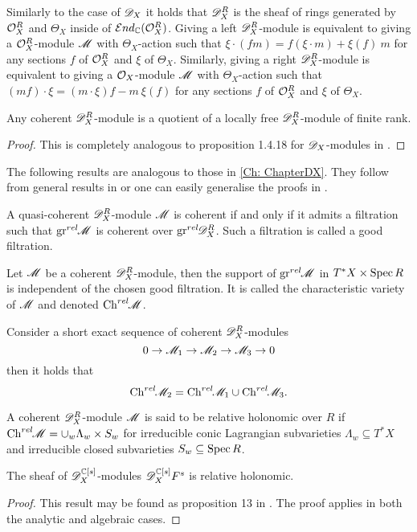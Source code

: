 Similarly to the case of $\mathscr{D}_X$ it holds that $\mathscr{D}_X^R$ is the sheaf of rings generated by $\mathcal{O}_X^R$ and $\Theta_X$ inside of $\mathcal{E}nd_{\mathbb{C}}(\mathcal{O}_X^R)$. Giving a left $\mathscr{D}_X^R$-module is equivalent to giving a $\mathcal{O}_X^R$-module $\mathscr{M}$ with $\Theta_X$-action such that
$\xi\cdot (fm) = f (\xi \cdot m)  + \xi(f)\ m  $
for any sections $f$ of $\mathcal{O}_X^R$ and $\xi$ of $\Theta_X$. Similarly, giving a right $\mathscr{D}_X^R$-module is equivalent to giving a $\mathcal{O}_X$-module $\mathscr{M}$ with $\Theta_X$-action such that $(mf)\cdot\xi = (m\cdot\xi)f - m\ \xi(f) $ for any sections $f$ of $\mathcal{O}_X^R$ and $\xi$ of $\Theta_X$.
\begin{proposition}\label{prop: QuotientLocallyFree}
  Any coherent $\mathscr{D}_X^R$-module is a quotient of a locally free $\mathscr{D}_X^R$-module of finite rank.
\end{proposition}
\begin{proof}
  This is completely analogous to proposition 1.4.18 for $\mathscr{D}_X$-modules in \cite[Chapter 1]{hotta2007d}.
\end{proof}
The following results are analogous to those in \cref{Ch: ChapterDX}.
They follow from general results in \cite[Appendix III]{bjork1993analytic} or one can easily generalise the proofs in \cite[Chapter 1]{hotta2007d}.
\begin{proposition}\label{prop: CoherentAndGoodFiltration}
    A quasi-coherent $\mathscr{D}_X^R$-module $\mathscr{M}$ is coherent if and only if it admits a filtration such that $\operatorname{gr}^{rel}\mkern-5mu \mathscr{M}$ is coherent over $\operatorname{gr}^{rel}\mkern-5mu \mathscr{D}_X^R$. Such a filtration is called a good filtration.
\end{proposition}
\begin{proposition}
    Let $\mathscr{M}$ be a coherent $\mathscr{D}_X^R$-module, then the support of $\operatorname{gr}^{rel}\mkern-5mu \mathscr{M}$ in $T^*X \times \operatorname{Spec} R$ is independent of the chosen good filtration. It is called the characteristic variety of $\mathscr{M}$ and denoted $\operatorname{Ch}^{rel}\mkern-5mu \mathscr{M}$.
\end{proposition}
\begin{lemma}\label{lem: SESBehaviourA}
    Consider a short exact sequence of coherent $\mathscr{D}_X^R$-modules
    $$0\to \mathscr{M}_1 \to \mathscr{M}_2 \to\mathscr{M}_3 \to 0 $$
    then it holds that
    $$\operatorname{Ch}^{rel}\mkern-5mu \mathscr{M}_2 = \operatorname{Ch}^{rel}\mkern-5mu \mathscr{M}_1 \cup \operatorname{Ch}^{rel}\mkern-5mu \mathscr{M}_3. $$
\end{lemma}

A coherent $\mathscr{D}_X^R$-module $\mathscr{M}$ is said to be relative holonomic over $R$ if $\operatorname{Ch}^{rel}\mkern-5mu \mathscr{M} = \cup_w \Lambda_w \times S_w$
for irreducible conic Lagrangian subvarieties $\Lambda_w\subseteq T^*X$ and irreducible closed subvarieties $S_w\subseteq \operatorname{Spec} R$.
\begin{lemma}\label{lem: RelHolGs}
  The sheaf of $\mathscr{D}_X^{\mathbb{C}[s]}$-modules $\mathscr{D}_X^{\mathbb{C}[s]} F^s$ is relative holonomic.
\end{lemma}
\begin{proof}
  This result may be found as proposition 13 in \cite{maisonobe2016filtration}. The proof applies in both the analytic and algebraic cases.
\end{proof}

